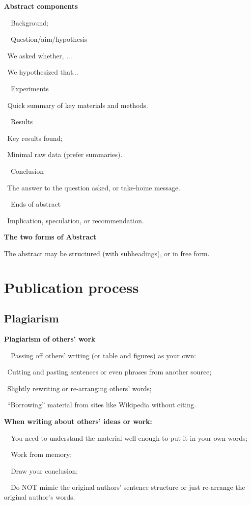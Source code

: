 \documentclass[a4paper, 12pt]{article}
\begin{document}
\textbf{Abstract components}
\par\ \textbullet\ Background;
\par\ \textbullet\ Question/aim/hypothesis
\par\quad\textopenbullet\ We asked whether, ...
\par\quad\textopenbullet\ We hypothesized that...
\par\ \textbullet\ Experiments
\par\quad\textopenbullet\ Quick summary of key materials and methods.
\par\ \textbullet\ Results
\par\quad\textopenbullet\ Key results found;
\par\quad\textopenbullet\ Minimal raw data (prefer summaries).
\par\ \textbullet\ Conclusion
\par\quad\textopenbullet\ The answer to the question asked, or take-home message.
\par\ \textbullet\ Ends of abstract
\par\quad\textopenbullet\ Implication, speculation, or recommendation.

\textbf{The two forms of Abstract}
\par The abstract may be structured (with subheadings), or in free form.

\newpage\quad

\newpage\section{Publication process}

\subsection{Plagiarism}

\textbf{Plagiarism of others' work}
\par\ \textbullet\ Passing off others' writing (or table and figures) as your own:
\par\quad\textopenbullet\ Cutting and pasting sentences or even phrases from another source;
\par\quad\textopenbullet\ Slightly rewriting or re-arranging others' words;
\par\quad\textopenbullet\ ``Borrowing'' material from sites like Wikipedia without citing.

\textbf{When writing about others' ideas or work:}
\par\ \textbullet\ You need to understand the material well enough to put it in your own words;
\par\ \textbullet\ Work from memory;
\par\ \textbullet\ Draw your conclusion;
\par\ \textbullet\ Do NOT mimic the original authors' sentence structure or just re-arrange the original author's words.
\end{document}
